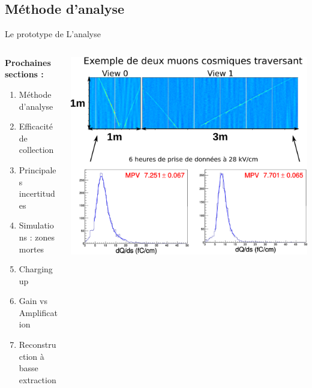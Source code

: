     \subsection{Méthode d'analyse}
    
    \begin{frame}{Le prototype de \TOO{}}{L'analyse}
        \begin{scriptsize}
       		\vfill
       		\begin{columns}
       			\begin{column}{0.32\textwidth}
           			\textbf{Prochaines sections :}
       				\begin{enumerate}
                        \item Méthode d'analyse
                        \item Efficacité de collection
                        \item Principales incertitudes
                        \item Simulations : zones mortes
                        \item Charging up
                        \item Gain vs Amplification
                        \item Reconstruction à basse extraction
                    \end{enumerate}
       			\end{column}\hfill
       			\begin{column}{0.72\textwidth}
       				\includegraphics[width=\textwidth]{./pictures/run840.png}\\
       			\end{column}
       		\end{columns}
\end{scriptsize}
    \end{frame}

